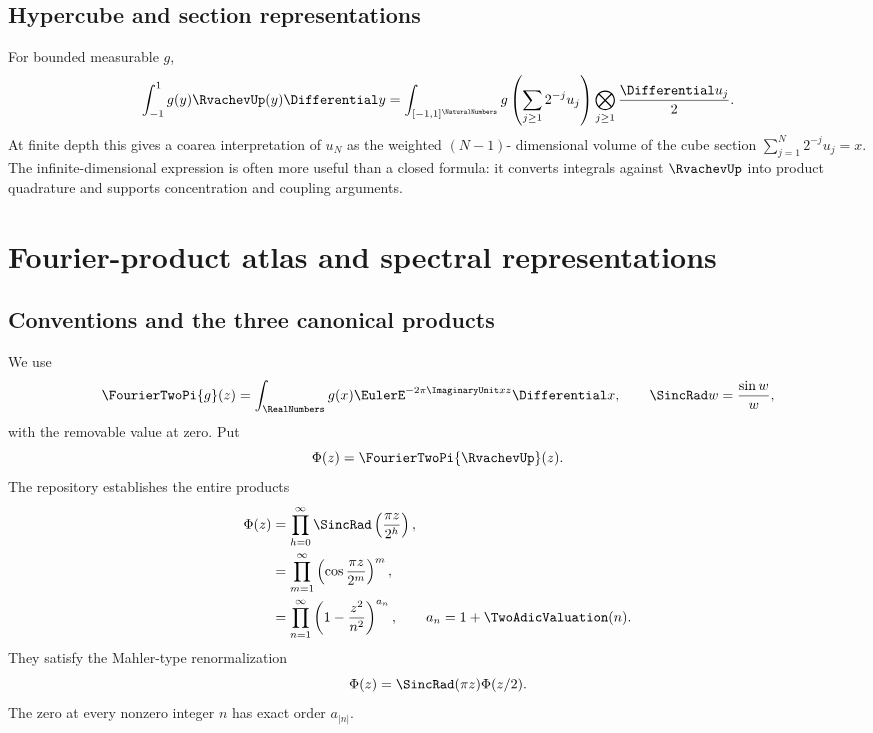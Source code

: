 \documentclass[11pt]{article}
\theoremstyle{definition}
\theoremstyle{remark}
\begin{document}
\subsection{Hypercube and section representations}

For bounded measurable $g$,
\begin{equation}
 \int_{-1}^{1}g(y)\RvachevUp(y)\Differential y
 =\int_{[-1,1]^{\NaturalNumbers}}g\left(\sum_{j\ge1}2^{-j}u_j\right)
   \bigotimes_{j\ge1}\frac{\Differential u_j}{2}.                 \label{p2:eq:infinite-cube}
\end{equation}
At finite depth this gives a coarea interpretation of $u_N$ as the weighted $(N-1)$-
dimensional volume of the cube section
\(
 \sum_{j=1}^N2^{-j}u_j=x.
\)
The infinite-dimensional expression is often more useful than a closed formula: it converts
integrals against $\RvachevUp$ into product quadrature and supports concentration and coupling
arguments.

\section{Fourier-product atlas and spectral representations}
\label{p2:sec:fourier-atlas}

\subsection{Conventions and the three canonical products}

We use
\begin{equation}
 \FourierTwoPi{g}(z)=\int_{\RealNumbers}g(x)\EulerE^{-2\pi\ImaginaryUnit xz}\Differential x,
 \qquad
 \SincRad w=\frac{\sin w}{w},                               \label{p2:eq:FT-convention}
\end{equation}
with the removable value at zero.  Put
\begin{equation}
 \Phi(z)=\FourierTwoPi{\RvachevUp}(z).                                  \label{p2:eq:Phi-def}
\end{equation}
The repository establishes the entire products
\begin{align}
 \Phi(z)
 &=\prod_{h=0}^{\infty}\SincRad\left(\frac{\pi z}{2^h}\right),
                                                               \label{p2:eq:Phi-sinc}\\
 &=\prod_{m=1}^{\infty}\left(\cos\frac{\pi z}{2^m}\right)^m,
                                                               \label{p2:eq:Phi-cos}\\
 &=\prod_{n=1}^{\infty}\left(1-\frac{z^2}{n^2}\right)^{a_n},
 \qquad a_n=1+\TwoAdicValuation(n).                                  \label{p2:eq:Phi-canonical}
\end{align}
They satisfy the Mahler-type renormalization
\begin{equation}
 \Phi(z)=\SincRad(\pi z)\Phi(z/2).                           \label{p2:eq:Phi-scale}
\end{equation}
The zero at every nonzero integer $n$ has exact order $a_{|n|}$.
\end{document}
